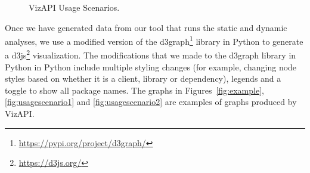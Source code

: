 \begin{figure}[h]
\begin{center}

\hspace{7mm}

\caption{\label{fig:usagescenarios} VizAPI Usage Scenarios.}

\end{center}
\end{figure}


Once we have generated data from our tool that runs the static and dynamic analyses, we use a modified version
of the d3graph\footnote{\url{https://pypi.org/project/d3graph/}} library in Python to generate a d3js\footnote{\url{https://d3js.org/}}
visualization. The modifications that we made to the d3graph  library in Python in Python include multiple styling changes (for example, changing node styles based on whether it is a client, library or dependency),
legends and a toggle to show all package names. 
The graphs in Figures~\ref{fig:example}, \ref{fig:usagescenario1} and \ref{fig:usagescenario2} are examples of graphs produced by VizAPI.

